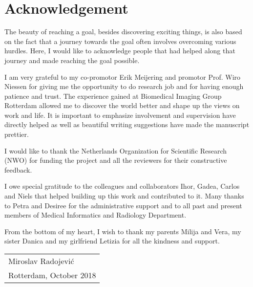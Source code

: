 %
% 

\chpos{14mm}{10mm}
\chapter*{Acknowledgement}

The beauty of reaching a goal, besides discovering exciting things, is also based on the fact that a journey towards the goal often involves overcoming various hurdles. Here, I would like to acknowledge people that had helped along that journey and made reaching the goal possible.

I am very grateful to my co-promotor Erik Meijering and promotor Prof. Wiro Niessen for giving me the opportunity to do research job and for having enough patience and trust. The experience gained at Biomedical Imaging Group Rotterdam allowed me to discover the world better and shape up the views on work and life. It is important to emphasize involvement and supervision have directly helped as well as beautiful writing suggestions have made the manuscript prettier.

I would like to thank the Netherlands Organization for Scientific Research (NWO) for funding the project and all the reviewers for their constructive feedback.

I owe special gratitude to the colleagues and collaborators Ihor, Gadea, Carlos and Niels that helped building up this work and contributed to it. Many thanks to Petra and Desiree for the administrative support and to all past and present members of Medical Informatics and Radiology Department.

From the bottom of my heart, I wish to thank my parents Milija and Vera, my sister Danica and my girlfriend Letizia for all the kindness and support.  

\bigskip
\begin{flushright}
  \begin{tabular}{@{}l@{}}
    Miroslav Radojevi\'{c}\\
    Rotterdam, October 2018
  \end{tabular}
\end{flushright}
